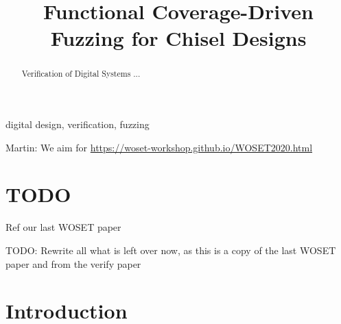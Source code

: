 \documentclass[conference]{IEEEtran}
\newcommand{\todo}[1]{{\color{olive} TODO: #1}}
\newcommand{\martin}[1]{{\color{blue} Martin: #1}}
\begin{document}

\title{Functional Coverage-Driven Fuzzing for Chisel Designs}

\author{


}


\maketitle \thispagestyle{empty}

\begin{abstract}

Verification of Digital Systems ...

\end{abstract}

\begin{IEEEkeywords}
digital design, verification, fuzzing
\end{IEEEkeywords}

\martin{We aim for \url{https://woset-workshop.github.io/WOSET2020.html}}

\section{TODO}

Ref our last WOSET paper

\todo{Rewrite all what is left over now, as this is a copy of the last WOSET paper and from the verify paper}


\section{Introduction}
\label{sec:intro}
\end{document}
